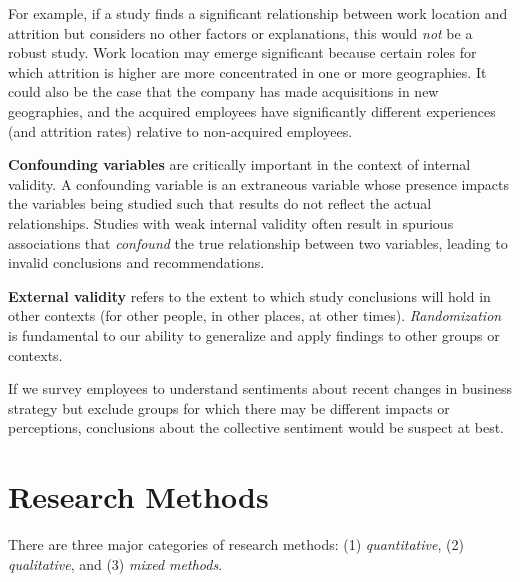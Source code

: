 \documentclass[
]{book}
\begin{document}
For example, if a study finds a significant relationship between work location and attrition but considers no other factors or explanations, this would \emph{not} be a robust study. Work location may emerge significant because certain roles for which attrition is higher are more concentrated in one or more geographies. It could also be the case that the company has made acquisitions in new geographies, and the acquired employees have significantly different experiences (and attrition rates) relative to non-acquired employees.

\textbf{Confounding variables} are critically important in the context of internal validity. A confounding variable is an extraneous variable whose presence impacts the variables being studied such that results do not reflect the actual relationships. Studies with weak internal validity often result in spurious associations that \emph{confound} the true relationship between two variables, leading to invalid conclusions and recommendations.

\textbf{External validity} refers to the extent to which study conclusions will hold in other contexts (for other people, in other places, at other times). \emph{Randomization} is fundamental to our ability to generalize and apply findings to other groups or contexts.

If we survey employees to understand sentiments about recent changes in business strategy but exclude groups for which there may be different impacts or perceptions, conclusions about the collective sentiment would be suspect at best.

\hypertarget{research-methods}{%
\section{Research Methods}\label{research-methods}}

There are three major categories of research methods: (1) \emph{quantitative}, (2) \emph{qualitative}, and (3) \emph{mixed methods}.
\end{document}
